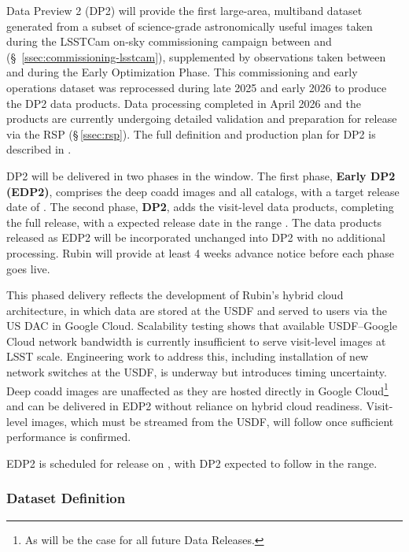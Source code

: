 Data Preview 2 (DP2) will provide the first large-area, multiband dataset generated from a subset of science-grade astronomically useful images taken during the LSSTCam on-sky commissioning campaign between \startsciencelsstcam and \finonskylsstcam(\S~\ref{ssec:commissioning-lsstcam}), supplemented by observations taken between \opsstartdate  and  \dptwocutoffdate during the Early Optimization Phase.
This commissioning and early operations dataset was reprocessed during late 2025 and early 2026 to produce the DP2 data products.
Data processing completed in April 2026 and the products are currently undergoing detailed validation and preparation for release via the RSP (\S\,\ref{ssec:rsp}).
The full definition and production plan for DP2 is described in .

DP2 will be delivered in two phases in the \dptwofulldaterange window.
The first phase, \textbf{Early DP2 (EDP2)}, comprises the deep coadd images and all catalogs, with a target release date of \edptwodate.
The second phase, \textbf{DP2}, adds the visit-level data products, completing the full release, with a expected release date in the range \dptwodate.
The data products released as EDP2 will be incorporated unchanged into DP2 with no additional processing.
Rubin will provide at least 4 weeks advance notice before each phase goes live.

This phased delivery reflects the development of Rubin's hybrid cloud architecture, in which data are stored at the USDF and served to users via the US DAC in Google Cloud.
Scalability testing shows that available USDF--Google Cloud network bandwidth is currently insufficient to serve visit-level images at LSST scale.
Engineering work to address this, including installation of new network switches at the USDF, is underway but introduces timing uncertainty.
Deep coadd images are unaffected as they are hosted directly in Google Cloud\footnote{As will be the case for all future Data Releases.} and can be delivered in EDP2 without reliance on hybrid cloud readiness.
Visit-level images, which must be streamed from the USDF, will follow once sufficient performance is confirmed.

EDP2 is scheduled for release on \edptwodate, with DP2 expected to follow in the \dptwodate range.

\subsubsection{Dataset Definition}
\label{sssec:dp2-sky}

